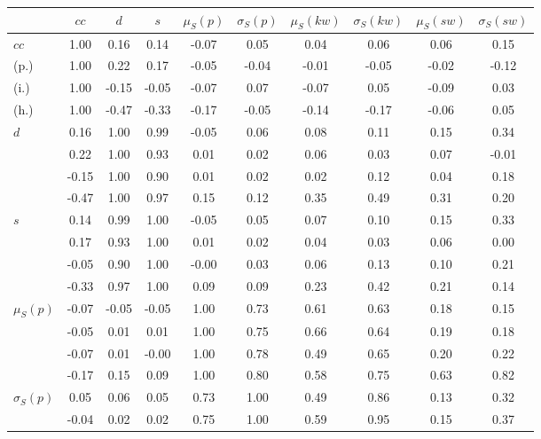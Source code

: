 \begin{table*}[h!]
\begin{center}
\begin{tabular}{| l | c | c | c | c | c | c | c | c | c |}\hline
 & $cc$ & $d$ & $s$ & $\mu_S(p)$ & $\sigma_S(p)$ & $\mu_S(kw)$ & $\sigma_S(kw)$ & $\mu_S(sw)$ & $\sigma_S(sw)$ \\\hline
$cc$ & 1.00  & 0.16  & 0.14  & -0.07  & 0.05  & 0.04  & 0.06  & 0.06  & 0.15 \\\hline
(p.) & 1.00  & 0.22  & 0.17  & -0.05  & -0.04  & -0.01  & -0.05  & -0.02  & -0.12 \\\hline
(i.) & 1.00  & -0.15  & -0.05  & -0.07  & 0.07  & -0.07  & 0.05  & -0.09  & 0.03 \\\hline
(h.) & 1.00  & -0.47  & -0.33  & -0.17  & -0.05  & -0.14  & -0.17  & -0.06  & 0.05 \\\hline
$d$ & 0.16  & 1.00  & 0.99  & -0.05  & 0.06  & 0.08  & 0.11  & 0.15  & 0.34 \\\hline
 & 0.22  & 1.00  & 0.93  & 0.01  & 0.02  & 0.06  & 0.03  & 0.07  & -0.01 \\\hline
 & -0.15  & 1.00  & 0.90  & 0.01  & 0.02  & 0.02  & 0.12  & 0.04  & 0.18 \\\hline
 & -0.47  & 1.00  & 0.97  & 0.15  & 0.12  & 0.35  & 0.49  & 0.31  & 0.20 \\\hline
$s$ & 0.14  & 0.99  & 1.00  & -0.05  & 0.05  & 0.07  & 0.10  & 0.15  & 0.33 \\\hline
 & 0.17  & 0.93  & 1.00  & 0.01  & 0.02  & 0.04  & 0.03  & 0.06  & 0.00 \\\hline
 & -0.05  & 0.90  & 1.00  & -0.00  & 0.03  & 0.06  & 0.13  & 0.10  & 0.21 \\\hline
 & -0.33  & 0.97  & 1.00  & 0.09  & 0.09  & 0.23  & 0.42  & 0.21  & 0.14 \\\hline
$\mu_S(p)$ & -0.07  & -0.05  & -0.05  & 1.00  & 0.73  & 0.61  & 0.63  & 0.18  & 0.15 \\\hline
 & -0.05  & 0.01  & 0.01  & 1.00  & 0.75  & 0.66  & 0.64  & 0.19  & 0.18 \\\hline
 & -0.07  & 0.01  & -0.00  & 1.00  & 0.78  & 0.49  & 0.65  & 0.20  & 0.22 \\\hline
 & -0.17  & 0.15  & 0.09  & 1.00  & 0.80  & 0.58  & 0.75  & 0.63  & 0.82 \\\hline
$\sigma_S(p)$ & 0.05  & 0.06  & 0.05  & 0.73  & 1.00  & 0.49  & 0.86  & 0.13  & 0.32 \\\hline
 & -0.04  & 0.02  & 0.02  & 0.75  & 1.00  & 0.59  & 0.95  & 0.15  & 0.37 \\\hline

\end{tabular}
\end{center}
\end{table*}
